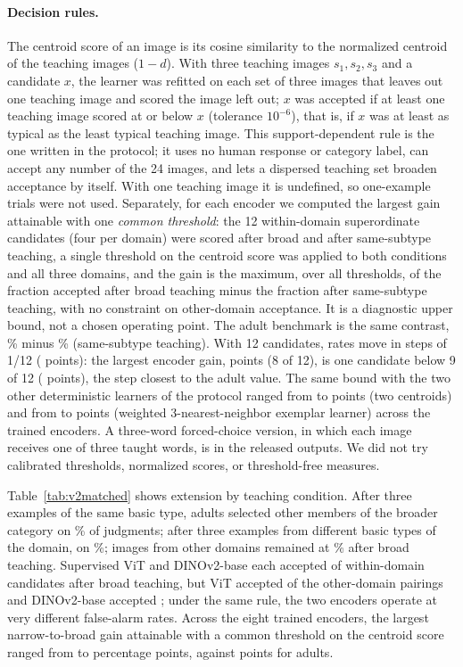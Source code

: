 \documentclass[11pt]{article}
\begin{document}
\paragraph{Decision rules.} The centroid score of an image is its cosine similarity to the normalized centroid of the teaching images ($1 - d$). With three teaching images $s_1, s_2, s_3$ and a candidate $x$, the learner was refitted on each set of three images that leaves out one teaching image and scored the image left out; $x$ was accepted if at least one teaching image scored at or below $x$ (tolerance $10^{-6}$), that is, if $x$ was at least as typical as the least typical teaching image. This support-dependent rule is the one written in the protocol; it uses no human response or category label, can accept any number of the 24 images, and lets a dispersed teaching set broaden acceptance by itself. With one teaching image it is undefined, so one-example trials were not used. Separately, for each encoder we computed the largest gain attainable with one \emph{common threshold}: the 12 within-domain superordinate candidates (four per domain) were scored after broad and after same-subtype teaching, a single threshold on the centroid score was applied to both conditions and all three domains, and the gain is the maximum, over all thresholds, of the fraction accepted after broad teaching minus the fraction after same-subtype teaching, with no constraint on other-domain acceptance. It is a diagnostic upper bound, not a chosen operating point. The adult benchmark is the same contrast, \VtXBroadPct\% minus \VcXSameSubPct\% (same-subtype teaching). With 12 candidates, rates move in steps of 1/12 (\VcXStep{} points): the largest encoder gain, \VtXJumpMax{} points (8 of 12), is one candidate below 9 of 12 (\VcXNextStep{} points), the step closest to the adult value. The same bound with the two other deterministic learners of the protocol ranged from \VcXJumpKcMin{} to \VcXJumpKcMax{} points (two centroids) and from \VcXJumpKnnMin{} to \VcXJumpKnnMax{} points (weighted 3-nearest-neighbor exemplar learner) across the trained encoders. A three-word forced-choice version, in which each image receives one of three taught words, is in the released outputs. We did not try calibrated thresholds, normalized scores, or threshold-free measures.


Table~\ref{tab:v2matched} shows extension by teaching condition. After three examples of the same basic type, adults selected other members of the broader category on \VtXSameBasicPct\% of judgments; after three examples from different basic types of the domain, on \VtXBroadPct\%; images from other domains remained at \VtXOutBroadPct\% after broad teaching. Supervised ViT and DINOv2-base each accepted \VtXViTIn{} of \VtXInN{} within-domain candidates after broad teaching, but ViT accepted \VtXViTOut{} of the \VtXOutN{} other-domain pairings and DINOv2-base accepted \VtXDinoBOut; under the same rule, the two encoders operate at very different false-alarm rates. Across the eight trained encoders, the largest narrow-to-broad gain attainable with a common threshold on the centroid score ranged from \VtXJumpMin{} to \VtXJumpMax{} percentage points, against \VtXJumpAdult{} points for adults.
\end{document}
